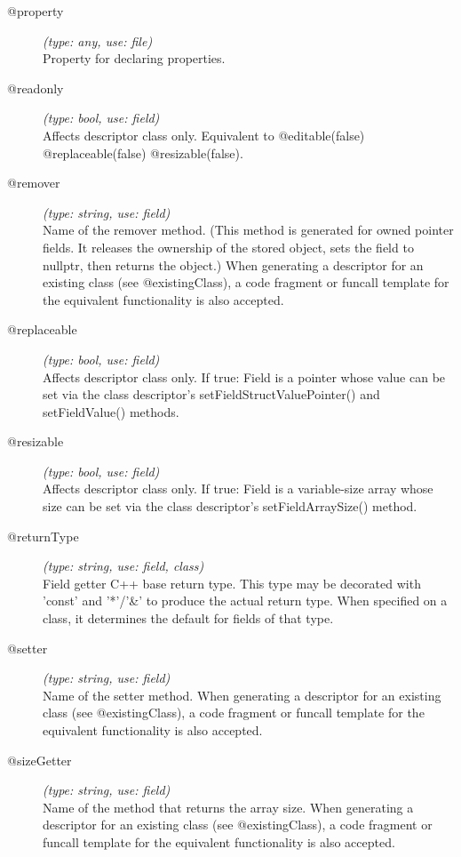 \begin{description}
\item[@property] \textit{(type: any, use: file)} \\
  Property for declaring properties.

\item[@readonly] \textit{(type: bool, use: field)} \\
  Affects descriptor class only. Equivalent to @editable(false)
  @replaceable(false) @resizable(false).

\item[@remover] \textit{(type: string, use: field)} \\
  Name of the remover method. (This method is generated for owned pointer
  fields. It releases the ownership of the stored object, sets the field to
  nullptr, then returns the object.) When generating a descriptor for an
  existing class (see @existingClass), a code fragment or funcall template for
  the equivalent functionality is also accepted.

\item[@replaceable] \textit{(type: bool, use: field)} \\
  Affects descriptor class only. If true: Field is a pointer whose value can
  be set via the class descriptor's setFieldStructValuePointer() and
  setFieldValue() methods.

\item[@resizable] \textit{(type: bool, use: field)} \\
  Affects descriptor class only. If true: Field is a variable-size array whose
  size can be set via the class descriptor's setFieldArraySize() method.

\item[@returnType] \textit{(type: string, use: field, class)} \\
  Field getter C++ base return type. This type may be decorated with 'const'
  and '*'/'\&' to produce the actual return type. When specified on a class,
  it determines the default for fields of that type.

\item[@setter] \textit{(type: string, use: field)} \\
  Name of the setter method. When generating a descriptor for an existing
  class (see @existingClass), a code fragment or funcall template for the
  equivalent functionality is also accepted.

\item[@sizeGetter] \textit{(type: string, use: field)} \\
  Name of the method that returns the array size. When generating a descriptor
  for an existing class (see @existingClass), a code fragment or funcall
  template for the equivalent functionality is also accepted.


\end{description}
